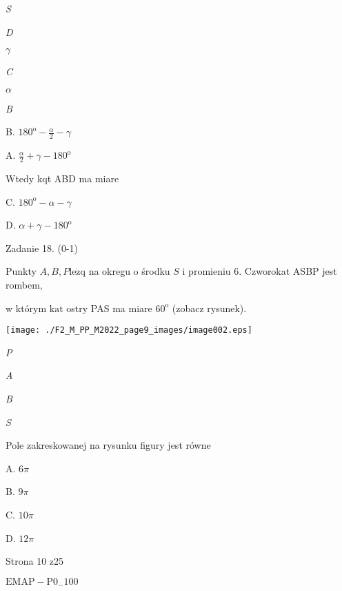 \documentclass[a4paper,12pt]{article}
\begin{document}
{\it S}

{\it D}

$\gamma$

{\it C}

$\alpha$

{\it B}

B. $ 180^{\mathrm{o}}-\displaystyle \frac{\alpha}{2}-\gamma$

A. $\displaystyle \frac{\alpha}{2}+\gamma-180^{\mathrm{o}}$

Wtedy kqt ABD ma miare

C. $ 180^{\mathrm{o}}-\alpha-\gamma$

D. $\alpha+\gamma-180^{\mathrm{o}}$

Zadanie 18. (0-1)

Punkty $A, B, P \mathrm{l}\mathrm{e}\dot{\mathrm{z}}\mathrm{q}$ na okregu o środku $S$ i promieniu 6. Czworokat ASBP jest rombem,

w którym $\mathrm{k}\mathrm{a}\mathrm{t}$ ostry PAS ma miare $60^{\mathrm{o}}$ (zobacz rysunek).
\begin{center}
\texttt{[image: ./F2\_M\_PP\_M2022\_page9\_images/image002.eps]}
\end{center}
{\it P}

{\it A}

{\it B}

{\it S}

Pole zakreskowanej na rysunku figury jest równe

A. $ 6\pi$

B. $ 9\pi$

C. $ 10\pi$

D. $ 12\pi$

Strona 10 z25

$\mathrm{E}\mathrm{M}\mathrm{A}\mathrm{P}-\mathrm{P}0_{-}100$
\end{document}
